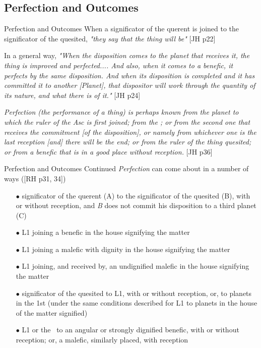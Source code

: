 \subsection{Perfection and Outcomes}
\begin{frame}[t]{Perfection and Outcomes}
When a significator of the querent is joined to the significator of the quesited, \textsl{"they say that the thing will be"} [JH p22]

In a general way, \textsl{"When the disposition comes to the planet that receives it, the thing is improved and perfected.... And also, when it comes to a benefic, it perfects by the same disposition. And when its disposition is completed and it has committed it to another [Planet], that dispositor will work through the quantity of its nature, and what there is of it."} [JH p24]

\begin{block}{}
\textsl{Perfection (the performance of a thing) is perhaps known from the planet to which the ruler of the Asc is first joined; from the \Moon; or from the second one that receives the commitment [of the disposition], or namely from whichever one is the last reception [and] there will be the end; or from the ruler of the thing quesited; or from a benefic that is in a good place without reception.} [JH p36]
\end{block}

\end{frame}
\begin{frame}[t]{Perfection and Outcomes Continued}
\textsl{Perfection} can come about in a number of ways ([RH p31, 34])
\small
\begin{itemize}
\item[$\bullet$] significator of the querent (A) to the significator of the quesited (B), with or without reception, and \textsl{B} does not commit his disposition to a third planet (C)
\item[$\bullet$] L1 joining a benefic in the house signifying the matter
\item[$\bullet$] L1 joining a malefic with dignity in the house signifying the matter
\item[$\bullet$] L1 joining, and received by, an undignified malefic in the house signifying the matter
\item[$\bullet$] significator of the quesited to L1, with or without reception, or, to planets in the 1st (under the same conditions described for L1 to planets in the house of the matter signified)
\item[$\bullet$] L1 or the \Moon\ to an angular or strongly dignified benefic, with or without reception; or, a malefic, similarly placed, with reception
\end{itemize}

\end{frame}
